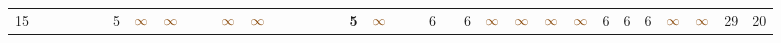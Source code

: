 \begin{landscape}
\begin{table}
\begin{adjustwidth}{-2.6cm}{}
{\begin{tabular}{l|lllllllllllllllllllllllllllllllll|ll}
		15   &            &                                                                 &                                                                 &                                                                 &                                                                 & 5                                                               & $\textcolor[rgb]{0.541,0.29,0.043}{\infty}$ & $\textcolor[rgb]{0.541,0.29,0.043}{\infty}$ &                                                                 &                                                                 & $\textcolor[rgb]{0.541,0.29,0.043}{\infty}$ & $\textcolor[rgb]{0.541,0.29,0.043}{\infty}$ &                                                                 &                                                                 &                                                                 &                                                                 &                                                                 & \textbf{5}                                                      & $\textcolor[rgb]{0.541,0.29,0.043}{\infty}$ &                                                                 &                                                                 & 6                                                               &                                                                 & 6                                                               & $\textcolor[rgb]{0.541,0.29,0.043}{\infty}$ & $\textcolor[rgb]{0.541,0.29,0.043}{\infty}$ & $\textcolor[rgb]{0.541,0.29,0.043}{\infty}$ & $\textcolor[rgb]{0.541,0.29,0.043}{\infty}$ & 6                                                               & 6                                                               & 6                                                               & $\textcolor[rgb]{0.541,0.29,0.043}{\infty}$ & $\textcolor[rgb]{0.541,0.29,0.043}{\infty}$ & 29         & 20          \\

\end{tabular}}
\end{adjustwidth}
\end{table}
\end{landscape}
